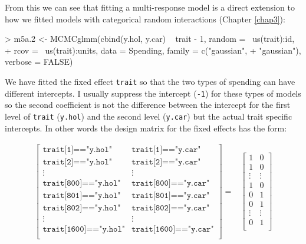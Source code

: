 \documentclass{article}
\begin{document}
From this we can see that fitting a multi-response model is a direct extension to how we fitted models with categorical random interactions (Chapter \ref{chap3}):

\begin{Schunk}
\begin{Sinput}
> m5a.2 <- MCMCglmm(cbind(y.hol, y.car) ~ trait - 1, random = ~us(trait):id, 
+     rcov = ~us(trait):units, data = Spending, family = c("gaussian", 
+         "gaussian"), verbose = FALSE)
\end{Sinput}
\end{Schunk}

We have fitted the fixed effect \texttt{trait} so that the two types of spending can have different intercepts. I usually suppress the intercept (\texttt{-1}) for these types of models so the second coefficient is not the difference between the intercept for the first level of \texttt{trait} (\texttt{y.hol}) and the second level (\texttt{y.car}) but the actual trait specific intercepts. In other words the design matrix for the fixed effects has the form:

\begin{displaymath}
\begin{array}{rl}
\left[
\begin{array}{cc}
\texttt{trait[1]=="y.hol"}&\texttt{trait[1]=="y.car"}\\
\texttt{trait[2]=="y.hol"}&\texttt{trait[2]=="y.car"}\\
\vdots&\vdots\\
\texttt{trait[800]=="y.hol"}&\texttt{trait[800]=="y.car"}\\
\texttt{trait[801]=="y.hol"}&\texttt{trait[801]=="y.car"}\\
\texttt{trait[802]=="y.hol"}&\texttt{trait[802]=="y.car"}\\
\vdots&\vdots\\
\texttt{trait[1600]=="y.hol"}&\texttt{trait[1600]=="y.car"}\\
\end{array}
\right]
=&
\left[
\begin{array}{cc}
1&0\\
1&0\\
\vdots&\vdots\\
1&0\\
0&1\\
0&1\\
\vdots&\vdots\\
0&1\\
\end{array}
\right]\\
\end{array}
\end{displaymath}
\end{document}
